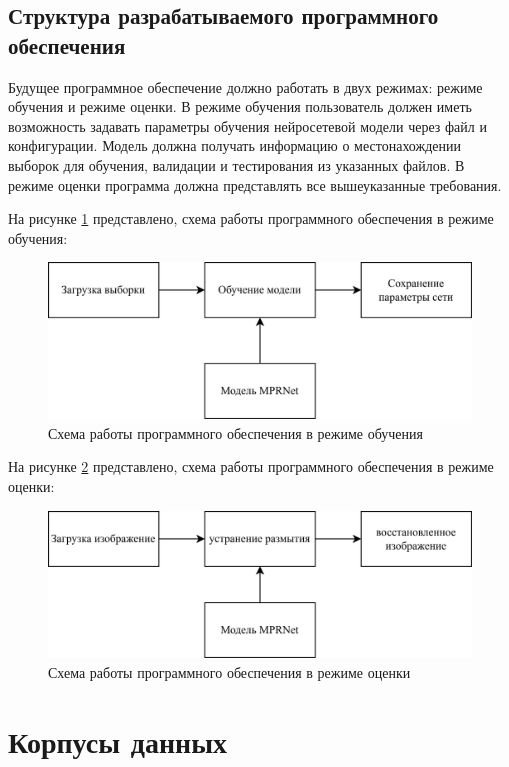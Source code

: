\subsection{Структура разрабатываемого программного обеспечения}

Будущее программное обеспечение должно работать в двух режимах: режиме обучения и режиме оценки. В режиме обучения пользователь должен иметь возможность задавать параметры обучения нейросетевой модели через файл и конфигурации. Модель должна получать информацию о местонахождении выборок для обучения, валидации и тестирования из указанных файлов. В режиме оценки программа должна представлять все вышеуказанные требования.

На рисунке \ref{fig:training-model} представлено, схема работы программного обеспечения в режиме обучения:
\begin{figure}[H]
	\includegraphics[width=1.0\linewidth]{assets/training-model.png}
	\caption{Схема работы программного обеспечения в режиме обучения}
	\label{fig:training-model}
\end{figure}

На рисунке \ref{fig:predict-model} представлено, схема работы программного обеспечения в режиме оценки:
\begin{figure}[H]
	\centering
	\includegraphics[width=1.0\linewidth]{assets/predict-model.png}
	\caption{Схема работы программного обеспечения в режиме оценки}
	\label{fig:predict-model}
\end{figure}

\section{Корпусы данных}

